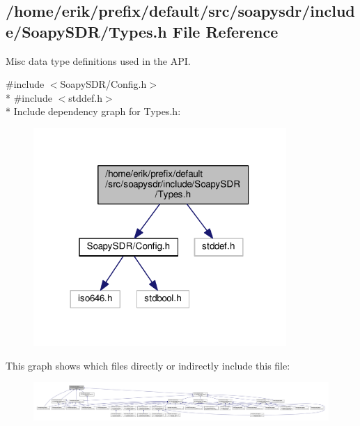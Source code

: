 \subsection{/home/erik/prefix/default/src/soapysdr/include/\+Soapy\+S\+D\+R/\+Types.h File Reference}
\label{Types_8h}


Misc data type definitions used in the A\+PI.  


{\ttfamily \#include $<$Soapy\+S\+D\+R/\+Config.\+h$>$}\\*
{\ttfamily \#include $<$stddef.\+h$>$}\\*
Include dependency graph for Types.\+h\+:
\nopagebreak
\begin{figure}[H]
\begin{center}
\leavevmode
\includegraphics[width=272pt]{da/d1e/Types_8h__incl}
\end{center}
\end{figure}
This graph shows which files directly or indirectly include this file\+:
\nopagebreak
\begin{figure}[H]
\begin{center}
\leavevmode
\includegraphics[width=350pt]{d3/d2d/Types_8h__dep__incl}
\end{center}
\end{figure}
